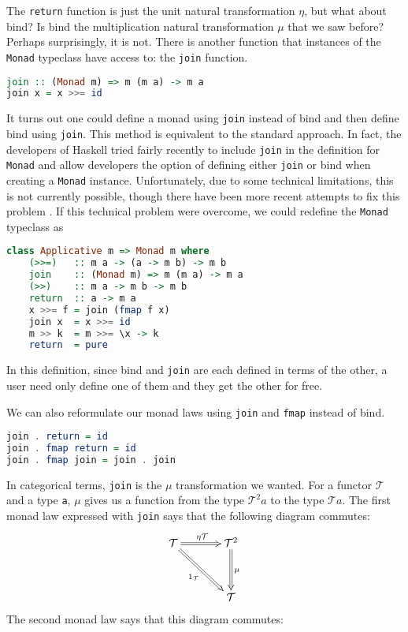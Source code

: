 \documentclass[MS, xcolor=dvipsnames]{wfuthesis}
\def\cT{\mathcal{T}}
\theoremstyle{definition}
\begin{document}
The \lstinline{return} function is just the unit natural transformation $\eta$, but what about bind? Is bind the multiplication natural transformation $\mu$ that we saw before? Perhaps surprisingly, it is not. There is another function that instances of the \lstinline{Monad} typeclass have access to: the \lstinline{join} function. 
\begin{lstlisting}[language=Haskell]
join :: (Monad m) => m (m a) -> m a
join x = x >>= id
\end{lstlisting}
It turns out one could define a monad using \lstinline{join} instead of bind and then define bind using \lstinline{join}. This method is equivalent to the standard approach. In fact, the developers of Haskell tried fairly recently to include \lstinline{join} in the definition for \lstinline{Monad} and allow developers the option of defining either \lstinline{join} or bind when creating a \mbox{\lstinline{Monad}} instance. Unfortunately, due to some technical limitations, this is not currently possible, though there have been more recent attempts to fix this problem \cite{Scott2018}. If this technical problem were overcome, we could redefine the \lstinline{Monad} typeclass as 
\begin{lstlisting}[language=Haskell]
class Applicative m => Monad m where
    (>>=)   :: m a -> (a -> m b) -> m b
    join    :: (Monad m) => m (m a) -> m a
    (>>)    :: m a -> m b -> m b
    return  :: a -> m a
    x >>= f = join (fmap f x)
    join x  = x >>= id
    m >> k  = m >>= \x -> k
    return  = pure
\end{lstlisting}
In this definition, since bind and \lstinline{join} are each defined in terms of the other, a user need only define one of them and they get the other for free. \par 
We can also reformulate our monad laws using \lstinline{join} and \lstinline{fmap} instead of bind. 
\begin{lstlisting}[language=Haskell]
join . return = id
join . fmap return = id
join . fmap join = join . join
\end{lstlisting}
In categorical terms, \lstinline{join} is the $\mu$ transformation we wanted. For a functor $\cT$ and a type \lstinline{a}, $\mu$ gives us a function from the type $\cT^2 a$ to the type $\cT a$. The first monad law expressed with \lstinline{join} says that the following diagram commutes:
\[ \SelectTips{cm}{}\xymatrix@R+1pc@C+1pc{
  \cT \ar@{=>}[r]^{\eta \cT} \ar@{=>}[dr]_{1_\cT} & \cT^2 \ar@{=>}[d]^\mu \\ & \cT
} \]
The second monad law says that this diagram commutes:
\end{document}
